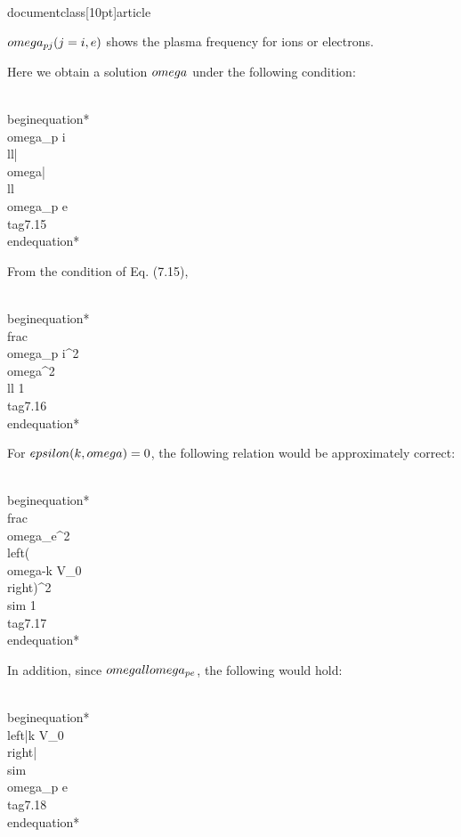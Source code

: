 \\documentclass[10pt]{article}
\begin{document}
{{{{$\\omega_{p j}(j=i, e)$ shows the plasma frequency for ions or electrons.

Here we obtain a solution $\\omega$ under the following condition:


\\begin{equation*}
\\omega_{p i} \\ll|\\omega| \\ll \\omega_{p e} \\tag{7.15}
\\end{equation*}


From the condition of Eq. (7.15),


\\begin{equation*}
\\frac{\\omega_{p i}^{2}}{\\omega^{2}} \\ll 1 \\tag{7.16}
\\end{equation*}


For $\\epsilon(k, \\omega)=0$, the following relation would be approximately correct:


\\begin{equation*}
\\frac{\\omega_{e}^{2}}{\\left(\\omega-k V_{0}\\right)^{2}} \\sim 1 \\tag{7.17}
\\end{equation*}


In addition, since $\\omega \\ll \\omega_{p e}$, the following would hold:


\\begin{equation*}
\\left|k V_{0}\\right| \\sim \\omega_{p e} \\tag{7.18}
\\end{equation*}


}}}}
\end{document}
